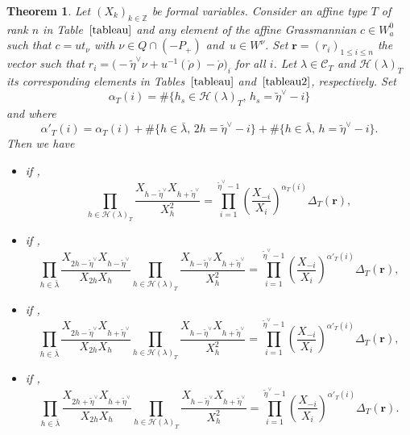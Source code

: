 \documentclass[10pt,a4paper]{amsart}
\newtheorem{Theorem}{Theorem}[section]
\numberwithin{equation}{section}
\newcommand{\cC}{\mathcal{C}}
\def\cch{\mathcal H}
\newcommand{\Z}{\mathbb{Z}}
\begin{document}
\begin{Theorem}\label{thm:enumhook}
Let $(X_k)_{k\in\Z}$ be formal variables.
Consider an affine type $T$ of rank $n$ in Table~$\ref{tableau}$ and any element of the affine Grassmannian $c\in W_{a}^{0}$ such that $c=ut_{\nu}$ with $\nu\in Q\cap(-P_{+})$ and~$u\in W^{\nu}$. Set $\mathbf{r}=(r_i)_{1\leq i\leq n}$ the vector such that $r_i=\bigl(-\tilde{\eta}^{\vee}\nu+u^{-1}(\mathring{\rho})-\mathring{\rho}\bigr)_i$ for all $i$. Let $\lambda\in\cC_T$ and $\cch(\lambda)_T$ its corresponding elements in Tables~$\ref{tableau}$ and~$\ref{tableau2}$, respectively. Set
\[
\alpha_{T}(i)=\#\bigl\lbrace h_s\in \cch(\lambda)_T , \, h_s=\tilde{\eta}^{\vee}-i\bigr\rbrace
\]
 and where
 \[
 \alpha'_{T}(i)=\alpha_T(i)+\#\bigl\lbrace h\in \bar{\lambda},\, 2h=\tilde{\eta}^{\vee}-i\bigr\rbrace+\#\bigl\lbrace h\in \bar{\lambda},\, h=\tilde{\eta}^{\vee}-i\bigr\rbrace.
\]
Then we have
\begin{itemize}\itemsep=0pt
\item if ,
\begin{equation}\label{eq:hookproductA}
\prod_{h\in\cch(\lambda)_T}\frac{X_{h-\tilde{\eta}^{\vee}}X_{h+\tilde{\eta}^{\vee}}}{X_h^2}=\prod_{i=1}^{\tilde{\eta}^{\vee}-1}\left(\frac{X_{-i}}{X_i}\right)^{\alpha_{T}(i)}\Delta_T(\mathbf{r}),
\end{equation}
\item if ,
\begin{equation*}
\prod_{h\in\bar{\lambda}}\frac{X_{2h-\tilde{\eta}^{\vee}}X_{h-\tilde{\eta}^{\vee}}}{X_{2h}X_h}
\prod_{h\in\cch(\lambda)_T}\frac{X_{h-\tilde{\eta}^{\vee}}X_{h+\tilde{\eta}^{\vee}}}{X_h^2}=\prod_{i=1}^{\tilde{\eta}^{\vee}-1}\left(\frac{X_{-i}}{X_i}\right)^{\alpha'_{T}(i)}\Delta_T(\mathbf{r}),
\end{equation*}
\item if ,
\begin{equation*}
\prod_{h\in\bar{\lambda}}\frac{X_{2h-\tilde{\eta}^{\vee}}X_{h+\tilde{\eta}^{\vee}}}{X_{2h}X_h}\prod_{h\in\cch(\lambda)_T}\frac{X_{h-\tilde{\eta}^{\vee}}X_{h+\tilde{\eta}^{\vee}}}{X_h^2}=\prod_{i=1}^{\tilde{\eta}^{\vee}-1}\left(\frac{X_{-i}}{X_i}\right)^{\alpha'_{T}(i)}\Delta_T(\mathbf{r}),
\end{equation*}
\item if ,
\begin{equation*}
\prod_{h\in\bar{\lambda}}\frac{X_{2h+\tilde{\eta}^{\vee}}X_{h+\tilde{\eta}^{\vee}}}{X_{2h}X_h}\prod_{h\in\cch(\lambda)_T} \frac{X_{h-\tilde{\eta}^{\vee}}X_{h+\tilde{\eta}^{\vee}}}{X_h^2}=\prod_{i=1}^{\tilde{\eta}^{\vee}-1} \left(\frac{X_{-i}}{X_i}\right)^{\alpha'_{T}(i)}\Delta_T(\mathbf{r}).
\end{equation*}
\end{itemize}
\end{Theorem}
\end{document}
